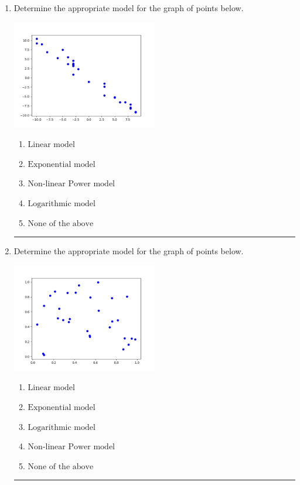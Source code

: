\documentclass[14pt]{extbook}
\newcommand{\litem}[1]{\item#1\hspace*{-1cm}\rule{\textwidth}{0.4pt}}
\begin{document}
\begin{enumerate}
\litem{
Determine the appropriate model for the graph of points below.
\begin{center}
    \includegraphics[width=0.5\textwidth]{../Figures/identifyModelGraph12CopyB.png}
\end{center}
\begin{enumerate}[label=\Alph*.]
\item \( \text{Linear model} \)
\item \( \text{Exponential model} \)
\item \( \text{Non-linear Power model} \)
\item \( \text{Logarithmic model} \)
\item \( \text{None of the above} \)

\end{enumerate} }
\litem{
Determine the appropriate model for the graph of points below.
\begin{center}
    \includegraphics[width=0.5\textwidth]{../Figures/identifyModelGraph12B.png}
\end{center}
\begin{enumerate}[label=\Alph*.]
\item \( \text{Linear model} \)
\item \( \text{Exponential model} \)
\item \( \text{Logarithmic model} \)
\item \( \text{Non-linear Power model} \)
\item \( \text{None of the above} \)


\end{enumerate}}
\end{enumerate}
\end{document}
